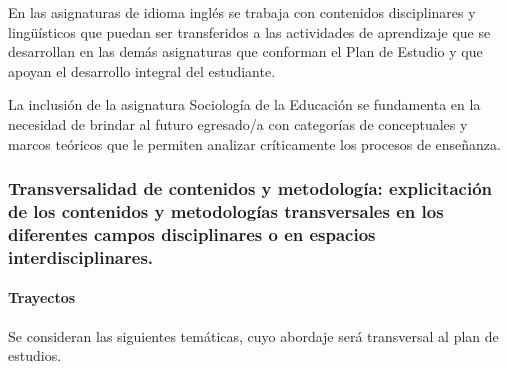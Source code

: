 \documentclass[a4paper, 12pt]{article}
\begin{document}
En las asignaturas de idioma inglés  se trabaja con contenidos disciplinares y lingüísticos que puedan ser transferidos a las actividades de aprendizaje que se desarrollan en las demás asignaturas que conforman el Plan de Estudio y que apoyan el desarrollo integral del estudiante.

La inclusión de la asignatura Sociología de la Educación se fundamenta en la necesidad de brindar al futuro egresado/a con categorías de conceptuales y marcos teóricos que le permiten analizar críticamente los procesos de enseñanza. 

\subsubsection{Transversalidad de contenidos y metodología: explicitación de los contenidos y metodologías transversales en los diferentes campos disciplinares o en espacios interdisciplinares.}


\paragraph{Trayectos}

Se consideran las siguientes temáticas, cuyo abordaje será transversal al plan de estudios. 
\end{document}

